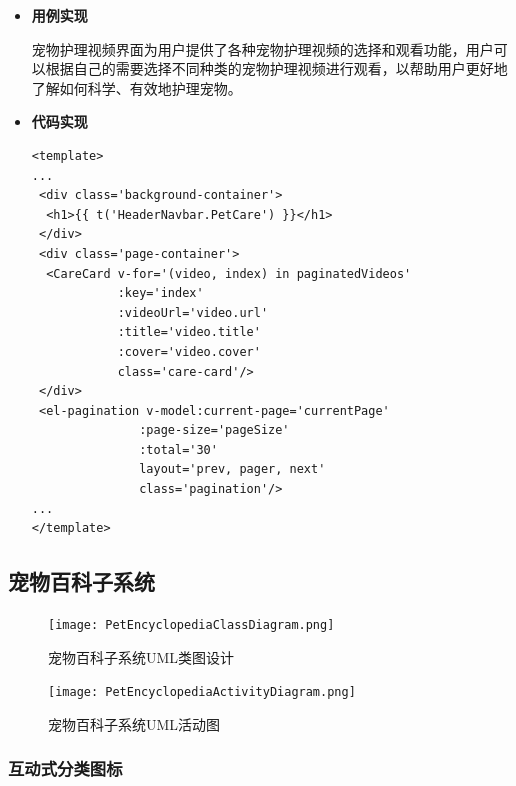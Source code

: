 \begin{itemize}
	\item \textbf{用例实现}
	
	宠物护理视频界面为用户提供了各种宠物护理视频的选择和观看功能，用户可以根据自己的需要选择不同种类的宠物护理视频进行观看，以帮助用户更好地了解如何科学、有效地护理宠物。
	
	\item \textbf{代码实现}
	\begin{verbatim}
<template>
...
 <div class='background-container'>
  <h1>{{ t('HeaderNavbar.PetCare') }}</h1>
 </div>
 <div class='page-container'>
  <CareCard v-for='(video, index) in paginatedVideos'
            :key='index'
            :videoUrl='video.url'
            :title='video.title'
            :cover='video.cover'
            class='care-card'/>
 </div>
 <el-pagination v-model:current-page='currentPage'
               :page-size='pageSize'
               :total='30'
               layout='prev, pager, next'
               class='pagination'/>
...
</template>
	\end{verbatim}
	
\end{itemize}

\subsection{宠物百科子系统}

\begin{figure}[H]
	\centering
	\texttt{[image: PetEncyclopediaClassDiagram.png]}
	\caption{宠物百科子系统UML类图设计}
\end{figure}

\begin{figure}[H]
	\centering
	\texttt{[image: PetEncyclopediaActivityDiagram.png]} 
	\caption{宠物百科子系统UML活动图}
	\label{fig:PetEncyclopediaActivityDiagram}
\end{figure}

\subsubsection{互动式分类图标}

